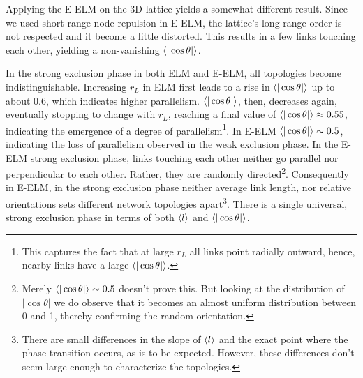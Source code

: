 \documentclass[nofootinbib,preprint,floatfix,endfloats]{revtex4} %
\begin{document}
Applying the E-ELM on the 3D lattice yields a somewhat different result. Since we used short-range node repulsion in E-ELM, the lattice's long-range order is not respected and it become a little distorted. This results in a few links touching each other, yielding a non-vanishing $\be{|\cos\theta|}$.

In the strong exclusion phase in both ELM and E-ELM, all topologies become indistinguishable. Increasing $r_L$ in ELM first leads to a rise in $\be{|\cos\theta|} $ up to about $0.6$, which indicates higher parallelism. 
$\be{|\cos\theta|}$, then, decreases again, eventually stopping to change with $r_L$, reaching a final value of $\be{|\cos\theta|} \approx 0.55 $, indicating the emergence of a degree of parallelism\footnote{
This captures the fact that at large $r_L$ all links point radially outward, hence, nearby links have a large  $\be{|\cos\theta|}$.}.
In E-ELM $\be{|\cos\theta|} \sim 0.5 $, indicating the loss of parallelism observed in the weak exclusion phase. 
In the E-ELM strong exclusion phase, links touching each other neither go parallel nor perpendicular to each other.
Rather, they are randomly directed\footnote{Merely  $\be{|\cos\theta|} \sim 0.5 $ doesn't prove this. But looking at the distribution of $|\cos\theta|$ we do observe that it becomes an almost uniform distribution between 0 and 1, thereby confirming the random orientation.}. 
Consequently in E-ELM, %
in the strong exclusion phase %
neither average link length, nor relative orientations sets different network topologies apart\footnote{
There are small differences in the slope of $\left<l\right>$ and the exact point where the phase transition occurs, as is to be expected.
However, these differences don't seem large enough to characterize the topologies.}. 
There is a single universal, strong exclusion phase in terms of both $\left<l\right>$ and $\be{|\cos\theta|}$. 
\end{document}
